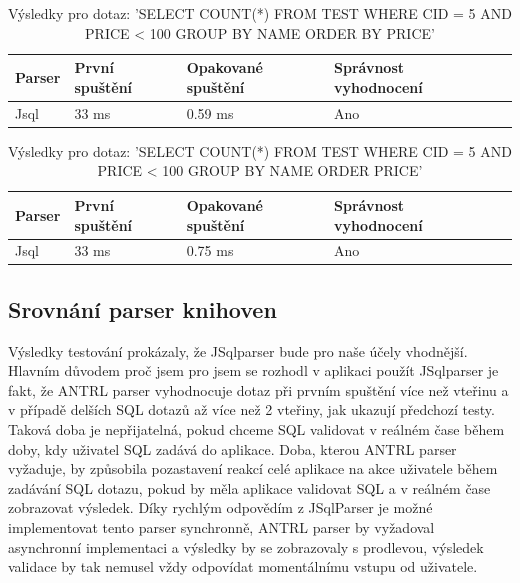 \documentclass[czech,bachelor,public,dept460,male,cpdeclaration,twoside]{diploma}
\begin{document}
\begin{table}[!htbp]
	\centering
	\caption{Výsledky pro dotaz: 'SELECT COUNT(*) FROM TEST WHERE CID = 5 AND PRICE < 100 GROUP BY NAME ORDER BY PRICE'}
	\label{tab:jsql3}
	\begin{tabular}{lllll}
		\toprule
		Parser & První spuštění & Opakované spuštění & Správnost vyhodnocení\\
		\midrule
		Jsql & 33 ms & 0.59 ms & Ano \\
		\midrule
	\end{tabular}
\end{table}

\begin{table}[!htbp]
	\centering
	\caption{Výsledky pro dotaz: 'SELECT COUNT(*) FROM TEST WHERE CID = 5 AND PRICE < 100 GROUP BY NAME ORDER PRICE'}
	\label{tab:jsql4}
	\begin{tabular}{lllll}
		\toprule
		Parser & První spuštění & Opakované spuštění & Správnost vyhodnocení\\
		\midrule
		Jsql & 33 ms & 0.75 ms & Ano \\
		\midrule
	\end{tabular}
\end{table}


\subsection{Srovnání parser knihoven}
Výsledky testování prokázaly, že JSqlparser bude pro naše účely vhodnější. Hlavním důvodem proč jsem pro jsem se rozhodl v aplikaci použít JSqlparser je fakt, že ANTRL parser vyhodnocuje dotaz při prvním spuštění více než vteřinu a v případě delších SQL dotazů až více než 2 vteřiny, jak ukazují předchozí testy. Taková doba je nepřijatelná, pokud chceme SQL validovat v reálném čase během doby, kdy uživatel SQL zadává do aplikace. Doba, kterou ANTRL parser vyžaduje, by způsobila pozastavení reakcí celé aplikace na akce uživatele během zadávání SQL dotazu, pokud by měla aplikace validovat SQL a v reálném čase zobrazovat výsledek. Díky rychlým odpovědím z JSqlParser je možné implementovat tento parser synchronně, ANTRL parser by vyžadoval asynchronní implementaci a výsledky by se zobrazovaly s prodlevou, výsledek validace by tak nemusel vždy odpovídat momentálnímu vstupu od uživatele.
\end{document}
